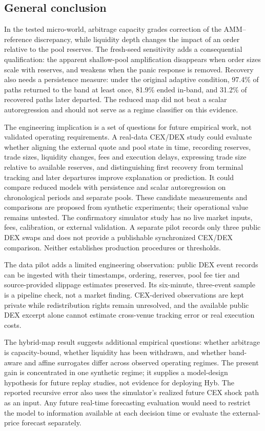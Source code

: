 \begin{samepage}
\section{General conclusion}

In the tested micro-world, arbitrage capacity grades correction of the AMM–reference discrepancy, while liquidity depth changes the impact of an order relative to the pool reserves. The fresh-seed sensitivity adds a consequential qualification: the apparent shallow-pool amplification disappears when order sizes scale with reserves, and weakens when the panic response is removed. Recovery also needs a persistence measure: under the original adaptive condition, 97.4\% of paths returned to the band at least once, 81.9\% ended in-band, and 31.2\% of recovered paths later departed. The reduced map did not beat a scalar autoregression and should not serve as a regime classifier on this evidence.

The engineering implication is a set of questions for future empirical work, not validated operating requirements. A real-data CEX/DEX study could evaluate whether aligning the external quote and pool state in time, recording reserves, trade sizes, liquidity changes, fees and execution delays, expressing trade size relative to available reserves, and distinguishing first recovery from terminal tracking and later departures improve explanation or prediction. It could compare reduced models with persistence and scalar autoregression on chronological periods and separate pools. These candidate measurements and comparisons are proposed from synthetic experiments; their operational value remains untested. The confirmatory simulator study has no live market inputs, fees, calibration, or external validation. A separate pilot records only three public DEX swaps and does not provide a publishable synchronized CEX/DEX comparison. Neither establishes production procedures or thresholds.

The data pilot adds a limited engineering observation: public DEX event records can be ingested with their timestamps, ordering, reserves, pool fee tier and source-provided slippage estimates preserved. Its six-minute, three-event sample is a pipeline check, not a market finding. CEX-derived observations are kept private while redistribution rights remain unresolved, and the available public DEX excerpt alone cannot estimate cross-venue tracking error or real execution costs.

The hybrid-map result suggests additional empirical questions: whether arbitrage is capacity-bound, whether liquidity has been withdrawn, and whether band-aware and affine surrogates differ across observed operating regimes. The present gain is concentrated in one synthetic regime; it supplies a model-design hypothesis for future replay studies, not evidence for deploying Hyb. The reported recursive error also uses the simulator's realized future CEX shock path as an input. Any future real-time forecasting evaluation would need to restrict the model to information available at each decision time or evaluate the external-price forecast separately.

\end{samepage}

